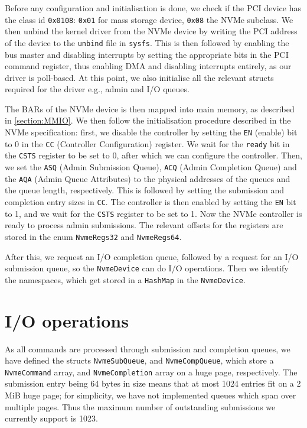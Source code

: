 Before any configuration and initialisation is done, we check if the PCI device has the class id \texttt{0x0108}: \texttt{0x01} for mass storage device, \texttt{0x08} the NVMe subclass.
We then unbind the kernel driver from the NVMe device by writing the PCI address of the device to the \texttt{unbind} file in \texttt{sysfs}. This is then followed by enabling the bus master and disabling interrupts by setting the appropriate bits in the PCI command register, thus enabling DMA and disabling interrupts entirely, as our driver is poll-based. At this point, we also initialise all the relevant structs required for the driver e.g., admin and I/O queues.

The BARs of the NVMe device is then mapped into main memory, as described in \autoref{section:MMIO}. We then follow the initialisation procedure described in the NVMe specification: first, we disable the controller by setting the \texttt{EN} (enable) bit to 0 in the \texttt{CC} (Controller Configuration) register. We wait for the \texttt{ready} bit in the \texttt{CSTS} register to be set to 0, after which we can configure the controller. Then, we set the \texttt{ASQ} (Admin Submission Queue), \texttt{ACQ} (Admin Completion Queue) and the \texttt{AQA} (Admin Queue Attributes) to the physical addresses of the queues and the queue length, respectively. This is followed by setting the submission and completion entry sizes in \texttt{CC}. The controller is then enabled by setting the \texttt{EN} bit to 1, and we wait for the \texttt{CSTS} register to be set to 1. Now the NVMe controller is ready to process admin submissions. The relevant offsets for the registers are stored in the enum \texttt{NvmeRegs32} and \texttt{NvmeRegs64}.

After this, we request an I/O completion queue, followed by a request for an I/O submission queue, so the \texttt{NvmeDevice} can do I/O operations. Then we identify the namespaces, which get stored in a \texttt{HashMap} in the \texttt{NvmeDevice}.

\section{I/O operations}\label{subsection:io}
As all commands are processed through submission and completion queues, we have defined the structs \texttt{NvmeSubQueue}, and \texttt{NvmeCompQueue}, which store a \texttt{NvmeCommand} array, and \texttt{NvmeCompletion} array on a huge page, respectively. The submission entry being 64 bytes in size means that at most 1024 entries fit on a 2 MiB huge page; for simplicity, we have not implemented queues which span over multiple pages. Thus the maximum number of outstanding submissions we currently support is 1023.

